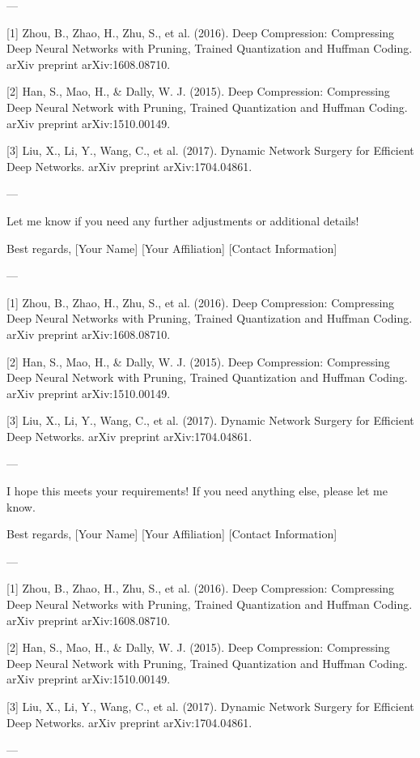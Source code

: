 ---

[1] Zhou, B., Zhao, H., Zhu, S., et al. (2016). Deep Compression: Compressing Deep Neural Networks with Pruning, Trained Quantization and Huffman Coding. arXiv preprint arXiv:1608.08710.

[2] Han, S., Mao, H., & Dally, W. J. (2015). Deep Compression: Compressing Deep Neural Network with Pruning, Trained Quantization and Huffman Coding. arXiv preprint arXiv:1510.00149.

[3] Liu, X., Li, Y., Wang, C., et al. (2017). Dynamic Network Surgery for Efficient Deep Networks. arXiv preprint arXiv:1704.04861. 

---

Let me know if you need any further adjustments or additional details! 

Best regards,  
[Your Name]  
[Your Affiliation]  
[Contact Information]  

---

[1] Zhou, B., Zhao, H., Zhu, S., et al. (2016). Deep Compression: Compressing Deep Neural Networks with Pruning, Trained Quantization and Huffman Coding. arXiv preprint arXiv:1608.08710.

[2] Han, S., Mao, H., & Dally, W. J. (2015). Deep Compression: Compressing Deep Neural Network with Pruning, Trained Quantization and Huffman Coding. arXiv preprint arXiv:1510.00149.

[3] Liu, X., Li, Y., Wang, C., et al. (2017). Dynamic Network Surgery for Efficient Deep Networks. arXiv preprint arXiv:1704.04861. 

---

I hope this meets your requirements! If you need anything else, please let me know. 

Best regards,  
[Your Name]  
[Your Affiliation]  
[Contact Information]  

---

[1] Zhou, B., Zhao, H., Zhu, S., et al. (2016). Deep Compression: Compressing Deep Neural Networks with Pruning, Trained Quantization and Huffman Coding. arXiv preprint arXiv:1608.08710.

[2] Han, S., Mao, H., & Dally, W. J. (2015). Deep Compression: Compressing Deep Neural Network with Pruning, Trained Quantization and Huffman Coding. arXiv preprint arXiv:1510.00149.

[3] Liu, X., Li, Y., Wang, C., et al. (2017). Dynamic Network Surgery for Efficient Deep Networks. arXiv preprint arXiv:1704.04861. 

---

